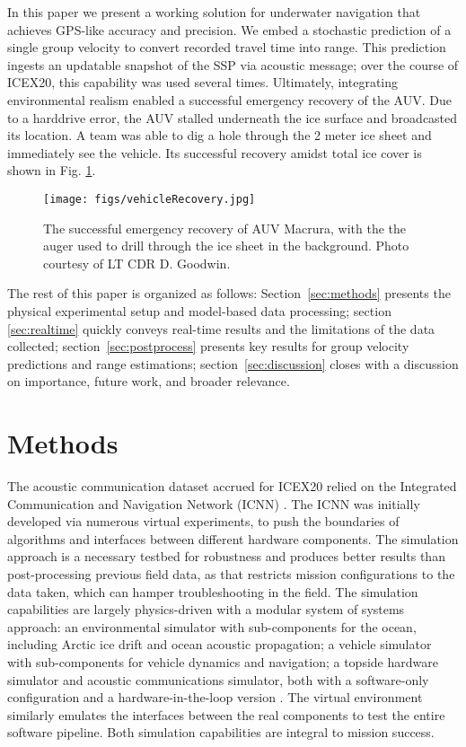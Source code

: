 In this paper we present a working solution for underwater navigation that achieves GPS-like accuracy and precision.
We embed a stochastic prediction of a single group velocity to convert recorded travel time into range.
This prediction ingests an updatable snapshot of the SSP via acoustic message; over the course of ICEX20, this capability was used several times. 
Ultimately, integrating environmental realism enabled a successful emergency recovery of the AUV.
Due to a harddrive error, the AUV stalled underneath the ice surface and broadcasted its location.
A team was able to dig a hole through the 2 meter ice sheet and immediately see the vehicle.
Its successful recovery amidst total ice cover is shown in Fig. \ref{fig:vehicleRecovery}.
\begin{figure}[h!]
	\centering
	\texttt{[image: figs/vehicleRecovery.jpg]}
	\caption{The successful emergency recovery of AUV Macrura, with the the auger used to drill through the ice sheet in the background. Photo courtesy of LT CDR D. Goodwin.}
	\label{fig:vehicleRecovery}
\end{figure} 

The rest of this paper is organized as follows: Section~\ref{sec:methods} presents the physical
experimental setup and model-based data processing; 
section \ref{sec:realtime} quickly conveys real-time results and the limitations of the data collected; section~\ref{sec:postprocess} presents key results for group velocity predictions and range estimations; section~\ref{sec:discussion} closes with a discussion on importance, future work, and broader relevance.

\section{\label{sec:methods} Methods}

The acoustic communication dataset accrued for ICEX20 relied on the Integrated Communication and Navigation Network (ICNN) \citep{schneider_self-adapting_2020,randeni_construction_2020,randeni_high-resolution_2021}.
The ICNN was initially developed via numerous virtual experiments, to push the boundaries of algorithms and interfaces between different hardware components.
The simulation approach is a necessary testbed for robustness and produces better results than post-processing previous field data, as that restricts mission configurations to the data taken, which can hamper troubleshooting in the field.
The simulation capabilities are largely physics-driven with a modular system of systems approach: an environmental simulator with sub-components for the ocean, including Arctic ice drift and ocean acoustic propagation; a vehicle simulator with sub-components for vehicle dynamics and navigation; a topside hardware simulator and acoustic communications simulator, both with a software-only configuration and a hardware-in-the-loop version \citep{schneider_netsim_2018}.
The virtual environment similarly emulates the interfaces between the real components to test the entire software pipeline.
Both simulation capabilities are integral to mission success.

